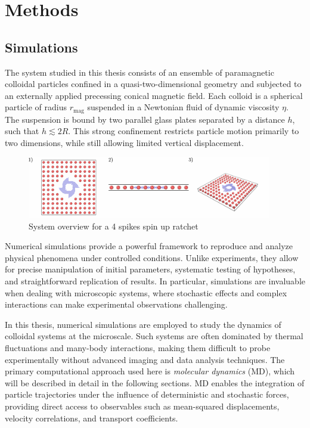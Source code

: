 \part{Methods}
\label{part:methods}

\chapter{Simulations}

The system studied in this thesis consists of an ensemble of paramagnetic colloidal particles confined in a quasi-two-dimensional geometry and subjected to an externally applied precessing conical magnetic field. Each colloid is a spherical particle of radius $r_{\mathrm{mag}}$ suspended in a Newtonian fluid of dynamic viscosity $\eta$. The suspension is bound by two parallel glass plates separated by a distance $h$, such that $h \lesssim 2R$. This strong confinement restricts particle motion primarily to two dimensions, while still allowing limited vertical displacement. 

\begin{figure}
  \begin{center}
    \includegraphics[width=0.95\textwidth]{figures/system.pdf}
  \end{center}
  \caption[System overview.]{System overview for a 4 spikes spin up ratchet}\label{fig:system}
\end{figure}


Numerical simulations provide a powerful framework to reproduce and analyze physical phenomena under controlled conditions. Unlike experiments, they allow for precise manipulation of initial parameters, systematic testing of hypotheses, and straightforward replication of results. In particular, simulations are invaluable when dealing with microscopic systems, where stochastic effects and complex interactions can make experimental observations challenging. 

In this thesis, numerical simulations are employed to study the dynamics of colloidal systems at the microscale. Such systems are often dominated by thermal fluctuations and many-body interactions, making them difficult to probe experimentally without advanced imaging and data analysis techniques. The primary computational approach used here is \textit{molecular dynamics} (MD), which will be described in detail in the following sections. MD enables the integration of particle trajectories under the influence of deterministic and stochastic forces, providing direct access to observables such as mean-squared displacements, velocity correlations, and transport coefficients.

